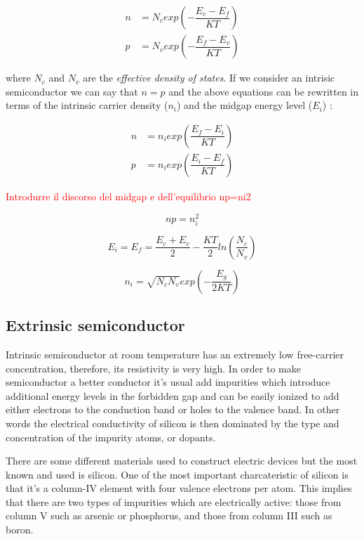 \begin{align}
n & = N_c exp\left(-\dfrac{E_c-E_f}{KT}\right) \label{eq: n density fd}\\
p & = N_v exp\left(-\dfrac{E_f-E_v}{KT}\right)  \label{eq: p density fd}
\end{align}

where $N_c$ and $N_v$ are the \textit{effective density of states}.
If we consider an intrisic semiconductor we can say that $n=p$ and the above equations can be rewritten in terms of the intrinsic carrier density ($n_i$) and the midgap energy level ($E_i$) :

\begin{align}
n & = n_i exp\left(\dfrac{E_f-E_i}{KT}\right) \label{eq: n density mb}\\
p & = n_i exp\left(\dfrac{E_i-E_f}{KT}\right)  \label{eq: p density mb}
\end{align}

\textcolor{red}{Introdurre il discorso del midgap e dell'equilibrio np=ni2}

\begin{equation}
\label{eq: legge di azione di massa}
np=n_i^2
\end{equation}

\begin{equation}
\label{eq: midgap equilibrium}
E_i=E_f=\dfrac{E_c+E_v}{2} - \dfrac{KT}{2}ln\left(\dfrac{N_c}{N_v}\right)
\end{equation}

\begin{equation}
\label{eq: ni equilibrium NcNv}
n_i = \sqrt{N_cN_v}exp\left(-\dfrac{E_g}{2KT}\right)
\end{equation}

\subsection{Extrinsic semiconductor}
Intrinsic semiconductor at room temperature has an extremely low free-carrier concentration, therefore, its resistivity is very high. In order to make semiconductor a better conductor it's usual add impurities which introduce additional energy levels in the forbidden gap and can be easily ionized to add either electrons to the conduction band or holes to the valence band. In other words the electrical conductivity of silicon is then dominated by the type and concentration of the impurity atoms, or dopants.

There are some different materials used to construct electric devices but the most known and used is silicon. One of the most important charcateristic of silicon is that it's a column-IV element with four valence electrons per atom. This implies that there are two types of impurities which are electrically active: those from column V such as arsenic or phosphorus, and those from column III such as boron.

